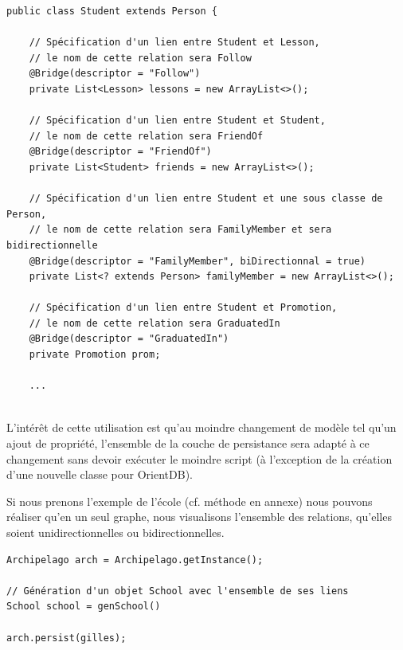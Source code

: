 \documentclass[a4paper,fleqn,12pt,oneside]{book}
\begin{document}
\begin{lstlisting}
public class Student extends Person {

    // Spécification d'un lien entre Student et Lesson, 
    // le nom de cette relation sera Follow
    @Bridge(descriptor = "Follow")
    private List<Lesson> lessons = new ArrayList<>();

    // Spécification d'un lien entre Student et Student, 
    // le nom de cette relation sera FriendOf
    @Bridge(descriptor = "FriendOf")
    private List<Student> friends = new ArrayList<>();
    
    // Spécification d'un lien entre Student et une sous classe de Person, 
    // le nom de cette relation sera FamilyMember et sera bidirectionnelle
    @Bridge(descriptor = "FamilyMember", biDirectionnal = true)
    private List<? extends Person> familyMember = new ArrayList<>();
    
    // Spécification d'un lien entre Student et Promotion, 
    // le nom de cette relation sera GraduatedIn
    @Bridge(descriptor = "GraduatedIn")
    private Promotion prom;
    
    ...
    
\end{lstlisting}

L'intérêt de cette utilisation est qu'au moindre changement de modèle tel qu'un ajout de propriété, l'ensemble de la couche de persistance sera adapté à ce changement sans devoir exécuter le moindre script (à l'exception de la création d'une nouvelle classe pour OrientDB).

Si nous prenons l'exemple de l'école (cf. méthode en annexe) nous pouvons réaliser qu'en un seul graphe, nous visualisons l'ensemble des relations, qu'elles soient unidirectionnelles ou bidirectionnelles.
\newpage

\begin{lstlisting}
Archipelago arch = Archipelago.getInstance();

// Génération d'un objet School avec l'ensemble de ses liens
School school = genSchool()

arch.persist(gilles);
\end{lstlisting}
\end{document}
